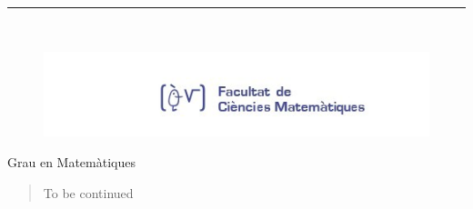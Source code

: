 \documentclass[11pt]{book}
\begin{document}
\begin{titlepage}
\begin{center}
\vspace*{0.5in}

\rule{110mm}{0.1mm}\\


\hspace{-3cm}
\begin{minipage}[t]{.45\textwidth}
\raggedleft
\begin{figure}[H]

\includegraphics[width=15cm]{LogoFac.jpeg}
\end{figure}
\end{minipage}
\hfill
\noindent
\begin{minipage}[t]{.45\textwidth}
\raggedleft

\vspace{2cm}
\hspace{-1cm}
\begin{Large}
Grau en Matem\`atiques\\
\end{Large}
\end{minipage}
\end{center}
\end{titlepage}

\newpage

\begin{abstract}
    To be continued
\end{abstract}

\tableofcontents
\tableofcontents
\listoffigures


\end{document}
